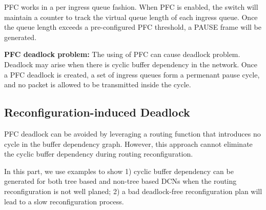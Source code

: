 PFC works in a per ingress queue fashion. When PFC is enabled, the switch will maintain a counter to track the virtual queue length of each ingress queue. Once the queue length exceeds a pre-configured PFC threshold, a PAUSE frame will be generated.

\textbf{PFC deadlock problem:} The using of PFC can cause deadlock problem. Deadlock may arise when there is cyclic buffer dependency in the network. Once a PFC deadlock is created, a set of ingress queues form a permenant pause cycle, and no packet is allowed to be transmitted inside the cycle.


\subsection{Reconfiguration-induced Deadlock}\label{subsec:reconfigdeadlock}

PFC deadlock can be avoided by leveraging a routing function that introduces no cycle in the buffer dependency graph. However, this approach cannot eliminate the cyclic buffer dependency during routing reconfiguration.

In this part, we use examples to show 1) cyclic buffer dependency can be generated for both tree based and non-tree based DCNs when the routing reconfiguration is not well planed; 2) a bad deadlock-free reconfiguration plan will lead to a slow reconfiguration process.

